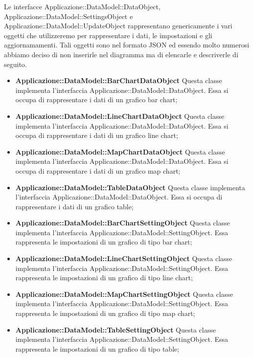 	Le interfacce Applicazione::DataModel::DataObject, Applicazione::DataModel::SettingsObject e Applicazione::DataModel::UpdateObject rappresentano genericamente i vari oggetti che utilizzeremo per rappresentare i dati, le impostazioni e gli aggiornamamenti. Tali oggetti sono nel formato JSON ed essendo molto numerosi abbiamo deciso di non inserirle nel diagramma ma di elencarle e descriverle di seguito.

	\begin{itemize}
		\item \textbf{Applicazione::DataModel::BarChartDataObject} Questa classe implementa l'interfaccia Applicazione::DataModel::DataObject. Essa si occupa di rappresentare i dati di un grafico bar chart;

		\item \textbf{Applicazione::DataModel::LineChartDataObject} Questa classe implementa l'interfaccia Applicazione::DataModel::DataObject. Essa si occupa di rappresentare i dati di un grafico line chart;

		\item \textbf{Applicazione::DataModel::MapChartDataObject} Questa classe implementa l'interfaccia Applicazione::DataModel::DataObject. Essa si occupa di rappresentare i dati di un grafico map chart;

		\item \textbf{Applicazione::DataModel::TableDataObject} Questa classe implementa l'interfaccia Applicazione::DataModel::DataObject. Essa si occupa di rappresentare i dati di un grafico table;

		\item \textbf{Applicazione::DataModel::BarChartSettingObject} Questa classe implementa l'interfaccia Applicazione::DataModel::SettingObject. Essa rappresenta le impostazioni di un grafico di tipo bar chart;

		\item \textbf{Applicazione::DataModel::LineChartSettingObject} Questa classe implementa l'interfaccia Applicazione::DataModel::SettingObject. Essa rappresenta le impostazioni di un grafico di tipo line chart;

		\item \textbf{Applicazione::DataModel::MapChartSettingObject} Questa classe implementa l'interfaccia Applicazione::DataModel::SettingObject. Essa rappresenta le impostazioni di un grafico di tipo map chart;

		\item \textbf{Applicazione::DataModel::TableSettingObject} Questa classe implementa l'interfaccia Applicazione::DataModel::SettingObject. Essa rappresenta le impostazioni di un grafico di tipo table;


\end{itemize}
